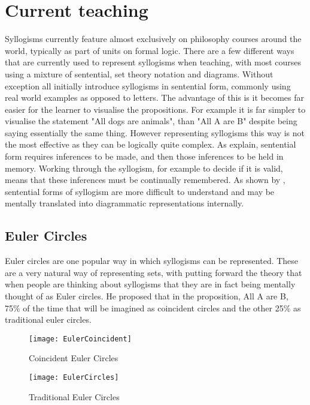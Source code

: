 \documentclass[12pt,a4paper]{report}
\begin{document}
\section{Current teaching}
Syllogisms currently feature almost exclusively on philosophy courses around the world, typically as part of units on formal logic. 
There are a few different ways that are currently used to represent syllogisms when teaching, with most courses using a mixture of sentential, set theory notation and diagrams. 
Without exception all initially introduce syllogisms in sentential form, commonly using real world examples as opposed to letters. The advantage of this is it becomes far easier for the learner to visualise the propositions. For example it is far simpler to visualise the statement "All dogs are animals", than "All A are B" despite being saying essentially the same thing. 
However representing syllogisms this way is not the most effective as they can be logically quite complex. As \citep{larkin1987diagram} explain, sentential form requires inferences to be made, and then those inferences to be held in memory. Working through the syllogism, for example to decide if it is valid, means that these inferences must be continually remembered. As shown by \cite{johnson1980mental}, sentential forms of syllogism are more difficult to understand and may be mentally translated into diagrammatic representations internally. 

\subsection{Euler Circles}
Euler circles are one popular way in which syllogisms can be represented. 
These are a very natural way of representing sets, with\cite{Erickson1978-ERIROS} putting forward the theory that when people are thinking about syllogisms that they are in fact being mentally thought of as Euler circles. He proposed that in the proposition, All A are B, 75\% of the time that will be imagined as coincident circles and the other 25\% as traditional euler circles.

\begin{figure}[!tbp]
  \centering
  \begin{minipage}[b]{0.4\textwidth}
    \texttt{[image: EulerCoincident]}
    \caption{Coincident Euler Circles }
  \end{minipage}
  \hfill
  \begin{minipage}[b]{0.4\textwidth}
    \texttt{[image: EulerCircles]}
    \caption{Traditional Euler Circles}
  \end{minipage}
\end{figure}
\end{document}
